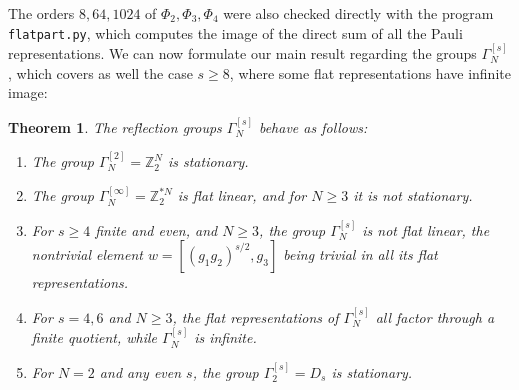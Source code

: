 \documentclass[12pt]{amsart}
\newtheorem{theorem}{Theorem}[section]
\theoremstyle{definition}
\begin{document}
The orders $8,64,1024$ of $\Phi_2,\Phi_3,\Phi_4$ were also checked directly with the program {\tt flatpart.py}, which computes the image of the direct sum of all the Pauli representations. We can now formulate our main result regarding the groups $\Gamma_N^{[s]}$, which covers as well the case $s\geq8$, where some flat representations have infinite image:

\begin{theorem}
The reflection groups $\Gamma_N^{[s]}$ behave as follows:
\begin{enumerate}
\item The group $\Gamma_N^{[2]}=\mathbb Z_2^N$ is stationary.

\item The group $\Gamma_N^{[\infty]}=\mathbb Z_2^{*N}$ is flat linear, and for $N\geq3$ it is not stationary.

\item For $s\geq4$ finite and even, and $N\geq3$, the group $\Gamma_N^{[s]}$ is not flat linear, the nontrivial element $w=[(g_1g_2)^{s/2},g_3]$ being trivial in all its flat representations.

\item For $s=4,6$ and $N\geq3$, the flat representations of $\Gamma_N^{[s]}$ all factor through a finite quotient, while $\Gamma_N^{[s]}$ is infinite.

\item For $N=2$ and any even $s$, the group $\Gamma_2^{[s]}=D_s$ is stationary.
\end{enumerate}
\end{theorem}
\end{document}
